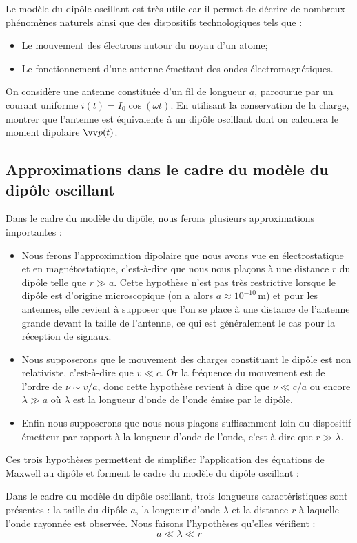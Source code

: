 \documentclass[11pt,fleqn]{book} %
\begin{document}
Le modèle du dipôle oscillant est très utile car il permet de décrire de nombreux phénomènes naturels ainsi que des dispositifs technologiques tels que :
\begin{itemize}
	\item Le mouvement des électrons autour du noyau d'un atome;
	\item Le fonctionnement d'une antenne émettant des ondes électromagnétiques.
\end{itemize}

\begin{capex}
	On considère une antenne constituée d'un fil de longueur $a$, parcourue par un courant uniforme $i(t) = I_0 \cos(\omega t)$. En utilisant la conservation de la charge, montrer que l'antenne est équivalente à un dipôle oscillant dont on calculera le moment dipolaire $\vv p(t)$.
\end{capex}

\subsection{Approximations dans le cadre du modèle du dipôle oscillant}

Dans le cadre du modèle du dipôle, nous ferons plusieurs approximations importantes :
\begin{itemize}
	\item Nous ferons l'approximation dipolaire que nous avons vue en électrostatique et en magnétostatique, c'est-à-dire que nous nous plaçons à une distance $r$ du dipôle telle que $r \gg a$. Cette hypothèse n'est pas très restrictive lorsque le dipôle est d'origine microscopique (on a alors $a \approx 10^{-10}$\,m) et pour les antennes, elle revient à supposer que l'on se place à une distance de l'antenne grande devant la taille de l'antenne, ce qui est généralement le cas pour la réception de signaux.
	\item Nous supposerons que le mouvement des charges constituant le dipôle est non relativiste, c'est-à-dire que $v \ll c$. Or la fréquence du mouvement est de l'ordre de $\nu \sim v/a$, donc cette hypothèse revient à dire que $\nu \ll c/a$ ou encore $\lambda \gg a$ où $\lambda$ est la longueur d'onde de l'onde émise par le dipôle.
	\item Enfin nous supposerons que nous nous plaçons suffisamment loin du dispositif émetteur par rapport à la longueur d'onde de l'onde, c'est-à-dire que $r \gg \lambda$.
\end{itemize}

Ces trois hypothèses permettent de simplifier l'application des équations de Maxwell au dipôle et forment le cadre du modèle du dipôle oscillant :
\begin{definition}
	Dans le cadre du modèle du dipôle oscillant, trois longueurs caractéristiques sont présentes : la taille du dipôle $a$, la longueur d'onde $\lambda$ et la distance $r$ à laquelle l'onde rayonnée est observée. Nous faisons l'hypothèses qu'elles vérifient :
	\begin{equation}
		a \ll \lambda \ll r
	\end{equation}
\end{definition}
\end{document}
